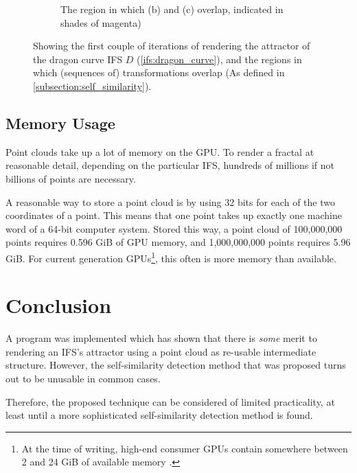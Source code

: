 \documentclass[11pt]{article}
\begin{document}
\begin{enumerate}
\begin{figure}
\begin{subfigure}[b]{0.4\textwidth}
         \caption{The region in which (b) and (c) overlap, indicated in shades of magenta)}
         \label{figure:dragon_curve_d}
     \end{subfigure}
        \caption{Showing the first couple of iterations of rendering the attractor of the dragon curve IFS $D$ (\autoref{ifs:dragon_curve}), and the regions in which (sequences of) transformations overlap (As defined in \autoref{subsection:self_similarity}).}
        \label{figure:dragon_curve_overlaps}
\end{figure}

\end{enumerate}

\subsection{Memory Usage}
\label{sec:org6a4f19c}

Point clouds take up a lot of memory on the GPU. To render a fractal at reasonable detail, depending on the particular IFS,
hundreds of millions if not billions of points are necessary.

A reasonable way to store a point cloud is by using 32 bits for each of the two coordinates of a point. 
This means that one point takes up exactly one machine word of a 64-bit computer system.
Stored this way, a point cloud of 100,000,000 points requires 0.596 GiB of GPU memory,
and 1,000,000,000 points requires 5.96 GiB.
For current generation GPUs\footnote{At the time of writing, high-end consumer GPUs contain somewhere between 2 and 24 GiB of available memory \cite{ign2020topgpus}.}, this often is more memory than available.


\section{Conclusion}
\label{sec:orga792377}
\label{section:conclusion}

A program was implemented which has shown that there is \emph{some} merit to rendering an IFS's attractor using a point cloud as re-usable intermediate structure.
However, the self-similarity detection method that was proposed turns out to be unusable in common cases.

Therefore, the proposed technique can be considered of limited practicality, 
at least until a more sophisticated self-similarity detection method is found.
\end{document}
